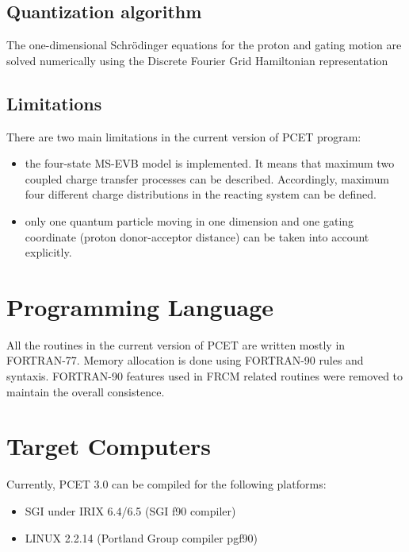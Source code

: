 \documentclass[oneside,11pt,openany]{book}
\begin{document}
\subsection{Quantization algorithm}
The one-dimensional Schr\"odinger equations for the proton
and gating motion are solved numerically using the Discrete
Fourier Grid Hamiltonian representation \cite{Webb-DFGH}

\subsection{Limitations}

There are two main limitations in the current version of PCET
program:
\begin{itemize}
\item the four-state MS-EVB model is implemented. It means that
      maximum two coupled charge transfer processes can be
      described. Accordingly, maximum four different charge
      distributions in the reacting system can be defined.
\item only one quantum particle moving in one dimension
      and one gating coordinate (proton donor-acceptor distance)
      can be taken into account explicitly.
\end{itemize}

\section{Programming Language}
All the routines in the current version of PCET are written
mostly in FORTRAN-77. Memory allocation is done using
FORTRAN-90 rules and syntaxis. FORTRAN-90 features
used in FRCM related routines were removed to maintain
the overall consistence.

\section{Target Computers}
Currently, PCET 3.0 can be compiled for the following platforms:
\begin{itemize}
\item SGI under IRIX 6.4/6.5 (SGI f90 compiler)
\item LINUX 2.2.14 (Portland Group compiler pgf90)
\end{itemize}

\end{document}
